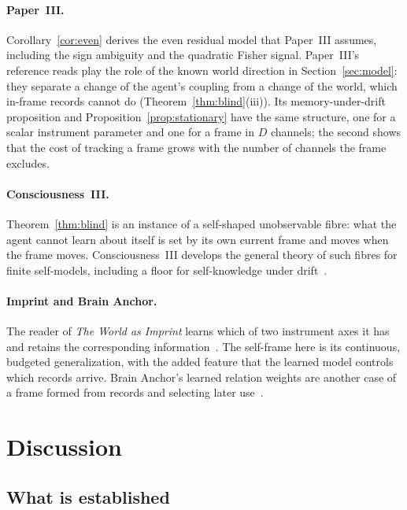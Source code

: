 \documentclass[12pt]{article}
\theoremstyle{definition}
\begin{document}
\paragraph{Paper~III.} Corollary~\ref{cor:even} derives the even residual model that Paper~III assumes, including the sign ambiguity and the quadratic Fisher signal. Paper~III's reference reads play the role of the known world direction in Section~\ref{sec:model}: they separate a change of the agent's coupling from a change of the world, which in-frame records cannot do (Theorem~\ref{thm:blind}(iii)). Its memory-under-drift proposition and Proposition~\ref{prop:stationary} have the same structure, one for a scalar instrument parameter and one for a frame in $D$ channels; the second shows that the cost of tracking a frame grows with the number of channels the frame excludes.

\paragraph{Consciousness~III.} Theorem~\ref{thm:blind} is an instance of a self-shaped unobservable fibre: what the agent cannot learn about itself is set by its own current frame and moves when the frame moves. Consciousness~III develops the general theory of such fibres for finite self-models, including a floor for self-knowledge under drift~\cite{Liu2026CIII}.

\paragraph{Imprint and Brain Anchor.} The reader of \emph{The World as Imprint} learns which of two instrument axes it has and retains the corresponding information~\cite{Liu2026IMPW}. The self-frame here is its continuous, budgeted generalization, with the added feature that the learned model controls which records arrive. Brain Anchor's learned relation weights are another case of a frame formed from records and selecting later use~\cite{Liu2026BRAIN}.

\section{Discussion}
\label{sec:discussion}

\subsection{What is established}
\end{document}
